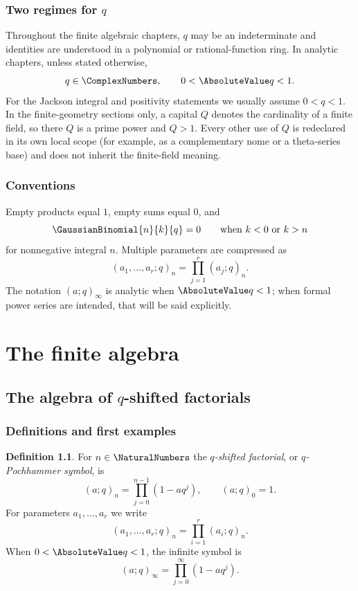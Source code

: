 \documentclass[11pt,a4paper,oneside,openany]{book}
\theoremstyle{definition}
\newtheorem{definition}[definition]{Definition}
\theoremstyle{remark}
\begin{document}
\section*{Two regimes for $q$}
Throughout the finite algebraic chapters, $q$ may be an indeterminate and identities are understood in a polynomial or rational-function ring.  In analytic chapters, unless stated otherwise,
\[
  q\in\ComplexNumbers,\qquad 0<\AbsoluteValue q<1.
\]
For the Jackson integral and positivity statements we usually assume $0<q<1$.
In the finite-geometry sections only, a capital $Q$ denotes the cardinality of a
finite field, so there $Q$ is a prime power and $Q>1$.  Every other use of $Q$
is redeclared in its own local scope (for example, as a complementary nome or a
theta-series base) and does not inherit the finite-field meaning.

\section*{Conventions}
Empty products equal $1$, empty sums equal $0$, and
\[
 \GaussianBinomial{n}{k}{q}=0\qquad\text{when }k<0\text{ or }k>n
\]
for nonnegative integral $n$.  Multiple parameters are compressed as
\[
 (a_1,\ldots,a_r;q)_n=\prod_{j=1}^r(a_j;q)_n.
\]
The notation $(a;q)_\infty$ is analytic when $\AbsoluteValue q<1$; when formal power series are intended, that will be said explicitly.

\tableofcontents

\mainmatter

\part{The finite algebra}

\chapter{The algebra of \texorpdfstring{$q$}{q}-shifted factorials}\label{chap:pochhammer}

\section{Definitions and first examples}

\begin{definition}\label{qg:def-qshifted-factorial}
For $n\in\NaturalNumbers$ the \emph{$q$-shifted factorial}, or \emph{$q$-Pochhammer symbol}, is
\[
 (a;q)_n=\prod_{j=0}^{n-1}(1-aq^j),\qquad (a;q)_0=1.
\]
For parameters $a_1,\dots,a_r$ we write
\[
 (a_1,\dots,a_r;q)_n=\prod_{i=1}^r(a_i;q)_n.
\]
When $0<\AbsoluteValue q<1$, the infinite symbol is
\[
 (a;q)_\infty=\prod_{j=0}^{\infty}(1-aq^j).
\]
\end{definition}
\end{document}
